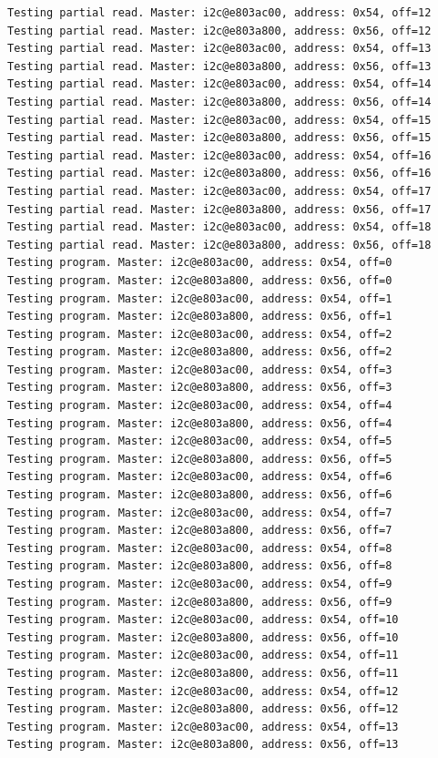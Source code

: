 \documentclass[11pt,a4paper,oneside]{article}
\begin{document}
\begin{lstlisting}
Testing partial read. Master: i2c@e803ac00, address: 0x54, off=12
Testing partial read. Master: i2c@e803a800, address: 0x56, off=12
Testing partial read. Master: i2c@e803ac00, address: 0x54, off=13
Testing partial read. Master: i2c@e803a800, address: 0x56, off=13
Testing partial read. Master: i2c@e803ac00, address: 0x54, off=14
Testing partial read. Master: i2c@e803a800, address: 0x56, off=14
Testing partial read. Master: i2c@e803ac00, address: 0x54, off=15
Testing partial read. Master: i2c@e803a800, address: 0x56, off=15
Testing partial read. Master: i2c@e803ac00, address: 0x54, off=16
Testing partial read. Master: i2c@e803a800, address: 0x56, off=16
Testing partial read. Master: i2c@e803ac00, address: 0x54, off=17
Testing partial read. Master: i2c@e803a800, address: 0x56, off=17
Testing partial read. Master: i2c@e803ac00, address: 0x54, off=18
Testing partial read. Master: i2c@e803a800, address: 0x56, off=18
Testing program. Master: i2c@e803ac00, address: 0x54, off=0
Testing program. Master: i2c@e803a800, address: 0x56, off=0
Testing program. Master: i2c@e803ac00, address: 0x54, off=1
Testing program. Master: i2c@e803a800, address: 0x56, off=1
Testing program. Master: i2c@e803ac00, address: 0x54, off=2
Testing program. Master: i2c@e803a800, address: 0x56, off=2
Testing program. Master: i2c@e803ac00, address: 0x54, off=3
Testing program. Master: i2c@e803a800, address: 0x56, off=3
Testing program. Master: i2c@e803ac00, address: 0x54, off=4
Testing program. Master: i2c@e803a800, address: 0x56, off=4
Testing program. Master: i2c@e803ac00, address: 0x54, off=5
Testing program. Master: i2c@e803a800, address: 0x56, off=5
Testing program. Master: i2c@e803ac00, address: 0x54, off=6
Testing program. Master: i2c@e803a800, address: 0x56, off=6
Testing program. Master: i2c@e803ac00, address: 0x54, off=7
Testing program. Master: i2c@e803a800, address: 0x56, off=7
Testing program. Master: i2c@e803ac00, address: 0x54, off=8
Testing program. Master: i2c@e803a800, address: 0x56, off=8
Testing program. Master: i2c@e803ac00, address: 0x54, off=9
Testing program. Master: i2c@e803a800, address: 0x56, off=9
Testing program. Master: i2c@e803ac00, address: 0x54, off=10
Testing program. Master: i2c@e803a800, address: 0x56, off=10
Testing program. Master: i2c@e803ac00, address: 0x54, off=11
Testing program. Master: i2c@e803a800, address: 0x56, off=11
Testing program. Master: i2c@e803ac00, address: 0x54, off=12
Testing program. Master: i2c@e803a800, address: 0x56, off=12
Testing program. Master: i2c@e803ac00, address: 0x54, off=13
Testing program. Master: i2c@e803a800, address: 0x56, off=13

\end{lstlisting}
\end{document}
